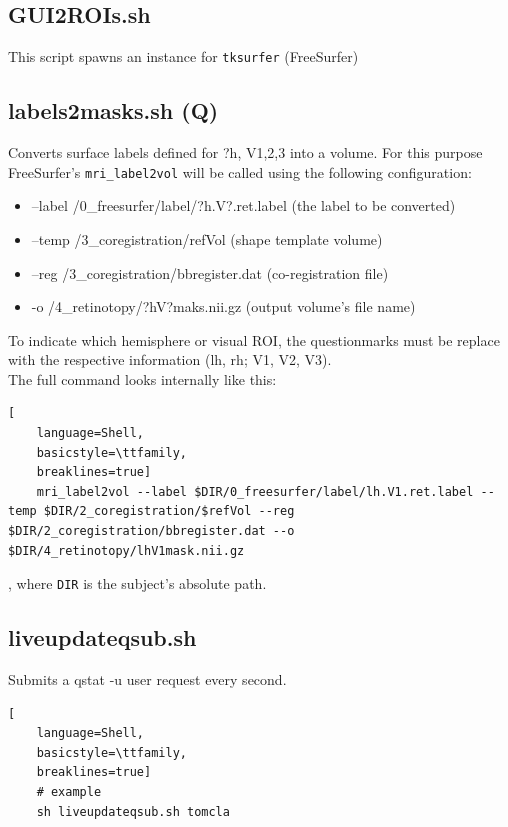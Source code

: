\documentclass[12pt,a4paper]{scrartcl}
\begin{document}
\subsection{GUI2ROIs.sh}
\label{sh:GUI2ROI}
This script spawns an instance for \texttt{tksurfer} (FreeSurfer)\\

\subsection{labels2masks.sh (Q)}
\label{sh:lbl2msk}
Converts surface labels defined for ?h, V1,2,3 into a volume. For this purpose FreeSurfer's \texttt{mri\_label2vol} will be called using the following configuration:
\begin{itemize}
  \item --label /0\_freesurfer/label/?h.V?.ret.label (the label to be converted)
  \item --temp /3\_coregistration/refVol (shape template volume)
  \item --reg /3\_coregistration/bbregister.dat (co-registration file)
  \item -o /4\_retinotopy/?hV?maks.nii.gz (output volume's file name)
\end{itemize}

To indicate which hemisphere or visual ROI, the questionmarks must be replace with the respective information (lh, rh; V1, V2, V3).\\

The full command looks internally like this:
\begin{lstlisting}[
    language=Shell,
    basicstyle=\ttfamily,
    breaklines=true]
    mri_label2vol --label $DIR/0_freesurfer/label/lh.V1.ret.label --temp $DIR/2_coregistration/$refVol --reg $DIR/2_coregistration/bbregister.dat --o $DIR/4_retinotopy/lhV1mask.nii.gz
\end{lstlisting}
, where \texttt{DIR} is the subject's absolute path.\\

\subsection{liveupdateqsub.sh}
\label{sh:liveupdate}
Submits a qstat -u user request every second.
\begin{lstlisting}[
    language=Shell,
    basicstyle=\ttfamily,
    breaklines=true]
    # example
    sh liveupdateqsub.sh tomcla
\end{lstlisting}
\end{document}
